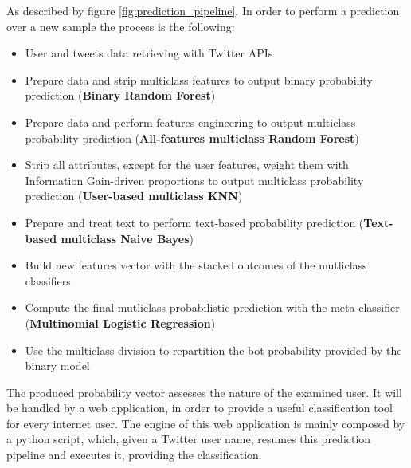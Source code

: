 As described by figure \ref{fig:prediction_pipeline}, In order to perform a prediction over a new sample the process is the following:
\begin{itemize}
	\item[\PencilRight]User and tweets data retrieving with Twitter APIs
	\item[\PencilRight]Prepare data and strip multiclass features to output binary probability prediction (\textbf{Binary Random Forest})
	\item[\PencilRight]Prepare data and perform features engineering to output multiclass probability prediction (\textbf{All-features multiclass Random Forest})
	\item[\PencilRight]Strip all attributes, except for the user features, weight them with Information Gain-driven proportions to output multiclass probability prediction (\textbf{User-based multiclass KNN})
	\item[\PencilRight]Prepare and treat text to perform text-based probability prediction (\textbf{Text-based multiclass Naive Bayes})
	\item[\PencilRight]Build new features vector with the stacked outcomes of the mutliclass classifiers
	\item[\PencilRight]Compute the final mutliclass probabilistic prediction with the meta-classifier (\textbf{Multinomial Logistic Regression})
	\item[\PencilRight]Use the multiclass division to repartition the bot probability provided by the binary model
\end{itemize}
The produced probability vector assesses the nature of the examined user.
It will be handled by a web application, in order to provide a useful classification tool for every internet user.
The engine of this web application is mainly composed by a python script, which, given a Twitter user name, resumes this prediction pipeline and executes it, providing the classification.

